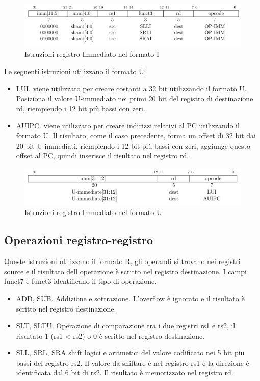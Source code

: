 \documentclass[12pt,a4paper]{report}
\begin{document}
\begin{figure}
	\includegraphics[width = \textwidth]{Istruzioni/Istruction2.png}
	\caption{Istruzioni registro-Immediato nel formato I}
	\label{Fig:Istruzioni_ri_formatoI}
\end{figure}

Le seguenti istruzioni utilizzano il formato U:
\begin{itemize}
\item  LUI. viene utilizzato per creare costanti a 32 bit utilizzando il formato U. Posiziona il valore U-immediato nei primi 20 bit del registro di destinazione rd, riempiendo i 12 bit più bassi con zeri.
\item AUIPC. viene utilizzato per creare indirizzi relativi al PC utilizzando il formato U.  Il risultato, come il caso precedente,  forma un offset di 32 bit dai 20 bit U-immediati, riempiendo i 12 bit più bassi con zeri, aggiunge questo offset al PC, quindi inserisce il risultato nel registro rd.
\end{itemize}

\begin{figure}
	\includegraphics[width = \textwidth]{Istruzioni/Istruction3.png}
	\caption{Istruzioni registro-Immediato nel formato U}
	\label{Fig:Istruzioni_ri_formatoU}
\end{figure}


\subsection{Operazioni registro-registro}
Queste istruzioni utilizzano il formato R, gli operandi si trovano nei registri source e il risultato dell operazione è scritto nel registro destinazione. I campi funct7 e funct3 identificano il tipo di operazione.

\begin{itemize}
	\item ADD, SUB. Addizione e sottrazione. L'overflow è ignorato e il risultato è scritto nel registro destinazione.  
	\item SLT, SLTU. Operazione di comparazione tra i due registri rs1 e rs2, il risultato 1 (rs1 < rs2) o 0 è scritto nel registro destinazione. 
	\item SLL, SRL, SRA shift logici e aritmetici del valore codificato nei 5 bit piu bassi del registro rs2. Il valore da shiftare è nel registro rs1 e la direzione è identificata dal 6 bit di rs2. Il risultato è memorizzato nel registro rd.
\end{itemize}
\end{document}
